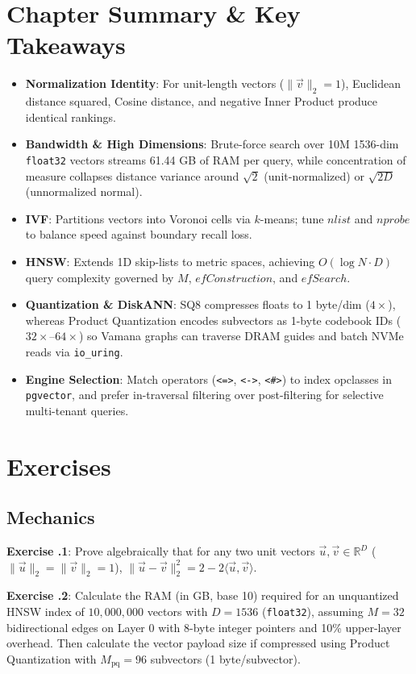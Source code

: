 \section{Chapter Summary \protect\& Key Takeaways}
\begin{itemize}[leftmargin=18pt]
  \item \textbf{Normalization Identity}: For unit-length vectors ($\|\vec{v}\|_2 = 1$), Euclidean distance squared, Cosine distance, and negative Inner Product produce identical rankings.
  \item \textbf{Bandwidth \& High Dimensions}: Brute-force search over 10M 1536-dim \texttt{float32} vectors streams 61.44 GB of RAM per query, while concentration of measure collapses distance variance around $\sqrt{2}$ (unit-normalized) or $\sqrt{2D}$ (unnormalized normal).
  \item \textbf{IVF}: Partitions vectors into Voronoi cells via $k$-means; tune $nlist$ and $nprobe$ to balance speed against boundary recall loss.
  \item \textbf{HNSW}: Extends 1D skip-lists to metric spaces, achieving $O(\log N \cdot D)$ query complexity governed by $M$, $efConstruction$, and $efSearch$.
  \item \textbf{Quantization \& DiskANN}: SQ8 compresses floats to 1 byte/dim ($4\times$), whereas Product Quantization encodes subvectors as 1-byte codebook IDs ($32\times$--$64\times$) so Vamana graphs can traverse DRAM guides and batch NVMe reads via \texttt{io\_uring}.
  \item \textbf{Engine Selection}: Match operators (\texttt{<=>}, \texttt{<->}, \texttt{<\#>}) to index opclasses in \texttt{pgvector}, and prefer in-traversal filtering over post-filtering for selective multi-tenant queries.
\end{itemize}

\section{Exercises}

\subsection*{Mechanics}
\textbf{Exercise \thechapter.1}: Prove algebraically that for any two unit vectors $\vec{u}, \vec{v} \in \mathbb{R}^D$ ($\|\vec{u}\|_2 = \|\vec{v}\|_2 = 1$), $\|\vec{u} - \vec{v}\|_2^2 = 2 - 2\langle \vec{u}, \vec{v} \rangle$.

\textbf{Exercise \thechapter.2}: Calculate the RAM (in GB, base 10) required for an unquantized HNSW index of $10{,}000{,}000$ vectors with $D = 1536$ (\texttt{float32}), assuming $M = 32$ bidirectional edges on Layer 0 with 8-byte integer pointers and 10\% upper-layer overhead. Then calculate the vector payload size if compressed using Product Quantization with $M_{\text{pq}} = 96$ subvectors (1 byte/subvector).


